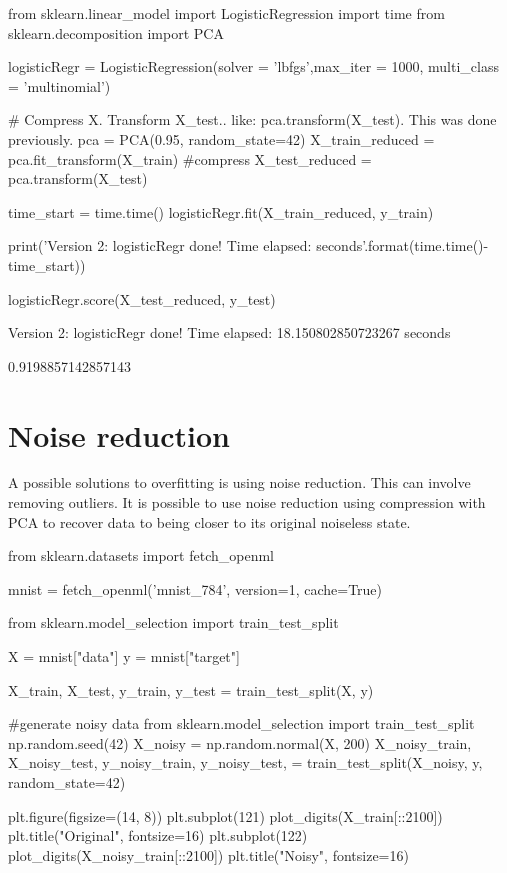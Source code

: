 \documentclass{article}
\begin{document}
\begin{pyminted}
from sklearn.linear_model import LogisticRegression
import time
from sklearn.decomposition import PCA

logisticRegr = LogisticRegression(solver = 'lbfgs',max_iter = 1000, multi_class = 'multinomial')

# Compress X. Transform X_test.. like: pca.transform(X_test). This was done previously.
pca = PCA(0.95, random_state=42)
X_train_reduced = pca.fit_transform(X_train) #compress
X_test_reduced = pca.transform(X_test)

time_start = time.time()
logisticRegr.fit(X_train_reduced, y_train)

print('Version 2: logisticRegr done! Time elapsed: {} seconds'.format(time.time()-time_start))

logisticRegr.score(X_test_reduced, y_test)
\end{pyminted}
\begin{pyconsole}
Version 2: logisticRegr done! Time elapsed: 18.150802850723267 seconds

0.9198857142857143
\end{pyconsole}


\section{Noise reduction}

A possible solutions to overfitting is using noise reduction. This can involve removing outliers. It is possible to use noise reduction using compression with PCA to recover data to being closer to its original noiseless state.

\begin{pyminted}
from sklearn.datasets import fetch_openml

mnist = fetch_openml('mnist_784', version=1, cache=True)
\end{pyminted}
\begin{pyminted}
from sklearn.model_selection import train_test_split

X = mnist["data"]
y = mnist["target"]

X_train, X_test, y_train, y_test = train_test_split(X, y)
\end{pyminted}
\begin{pyminted}
#generate noisy data
from sklearn.model_selection import train_test_split
np.random.seed(42)
X_noisy = np.random.normal(X, 200)
X_noisy_train, X_noisy_test, y_noisy_train, y_noisy_test, = train_test_split(X_noisy, y, random_state=42)

plt.figure(figsize=(14, 8))
plt.subplot(121)
plot_digits(X_train[::2100])
plt.title("Original", fontsize=16)
plt.subplot(122)
plot_digits(X_noisy_train[::2100])
plt.title("Noisy", fontsize=16)
\end{pyminted}
\end{document}

